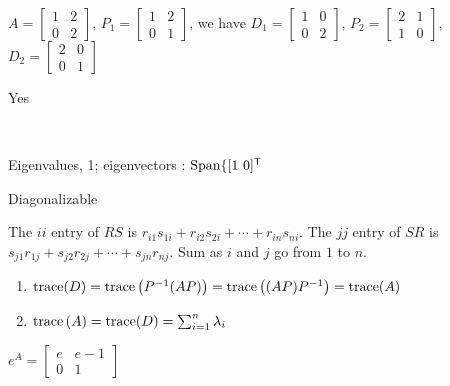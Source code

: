 \begin{multicols}{2}
\ea
 

\item $A = \left[ \begin{array}{cc} 1&2\\0&2 \end{array} \right]$, $P_1 = \left[ \begin{array}{cc} 1&2 \\ 0&1 \end{array} \right]$, we have $D_1 =  \left[ \begin{array}{cc} 1&0 \\ 0&2 \end{array} \right]$,  $P_2 = \left[ \begin{array}{cc} 2&1 \\ 1&0 \end{array} \right]$, $D_2 = \left[ \begin{array}{cc} 2&0 \\ 0&1 \end{array} \right]$

\item Yes

\item ~
\ba
\item Eigenvalues, 1; eigenvectors : $\text{Span} \{[1 \ 0]^{\mathsf{T}}$ 

\item  Diagonalizable

\ea


\item 
\ba
\item The $ii$ entry of $RS$ is $r_{i1}s_{1i} + r_{i2}s_{2i} + \cdots + r_{in}s_{ni}$. The $jj$ entry of $SR$ is $s_{j1}r_{1j} + s_{j2}r_{2j} + \cdots + s_{jn}r_{nj}$. Sum as $i$ and $j$ go from $1$ to $n$. 

\item 
	\begin{enumerate}[label=\roman*.]
	\item $\text{trace}(D) = \text{trace}\left(P^{-1}(AP)\right) = \text{trace}\left((AP)P^{-1}\right) = \text{trace}(A)$ 
	\item $\text{trace}\left(A\right) = \text{trace}(D) = \sum_{i=1}^n \lambda_i$
	\end{enumerate}
\ea

\item  
\ba
\item $e^A = \left[ \begin{array}{cc} e&e-1\\0&1 \end{array} \right]$


\end{multicols}
